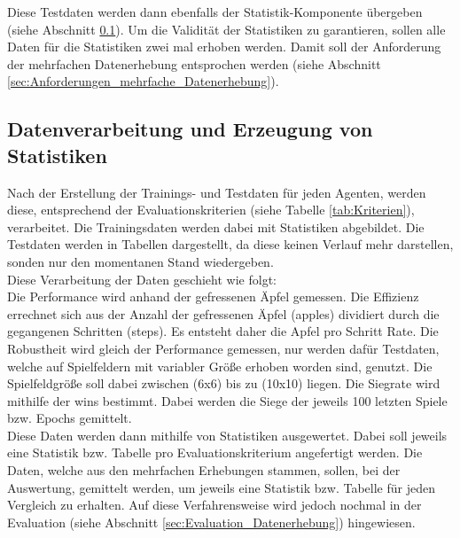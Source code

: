 Diese Testdaten werden dann ebenfalls der Statistik-Komponente übergeben (siehe Abschnitt \ref{sec:Konzept_Datenverarbeitung}).
Um die Validität der Statistiken zu garantieren, sollen alle Daten für die Statistiken zwei mal erhoben werden. Damit soll der Anforderung der mehrfachen Datenerhebung entsprochen werden (siehe Abschnitt \ref{sec:Anforderungen_mehrfache_Datenerhebung}). 

\subsection{Datenverarbeitung und Erzeugung von Statistiken} \label{sec:Konzept_Datenverarbeitung}
Nach der Erstellung der Trainings- und Testdaten für jeden Agenten, werden diese, entsprechend der Evaluationskriterien (siehe Tabelle \ref{tab:Kriterien}), verarbeitet. Die Trainingsdaten werden dabei mit Statistiken abgebildet. Die Testdaten werden in Tabellen dargestellt, da diese keinen Verlauf mehr darstellen, sonden nur den momentanen Stand wiedergeben.\\
Diese Verarbeitung der Daten geschieht wie folgt:\\
Die Performance wird anhand der gefressenen Äpfel gemessen. Die Effizienz errechnet sich aus der Anzahl der gefressenen Äpfel (apples) dividiert durch die gegangenen Schritten (steps). Es entsteht daher die Apfel pro Schritt Rate.
Die Robustheit wird gleich der Performance gemessen, nur werden dafür Testdaten, welche auf Spielfeldern mit variabler Größe erhoben worden sind, genutzt. Die Spielfeldgröße soll dabei zwischen (6x6) bis zu (10x10) liegen.
Die Siegrate wird mithilfe der wins bestimmt. Dabei werden die Siege der jeweils 100 letzten Spiele bzw. Epochs gemittelt.\\
Diese Daten werden dann mithilfe von Statistiken ausgewertet. Dabei soll jeweils eine Statistik bzw. Tabelle pro Evaluationskriterium angefertigt werden. Die Daten, welche aus den mehrfachen Erhebungen stammen, sollen, bei der Auswertung, gemittelt werden, um jeweils eine Statistik bzw. Tabelle für jeden Vergleich zu erhalten. Auf diese Verfahrensweise wird jedoch nochmal in der Evaluation (siehe Abschnitt \ref{sec:Evaluation_Datenerhebung}) hingewiesen.
